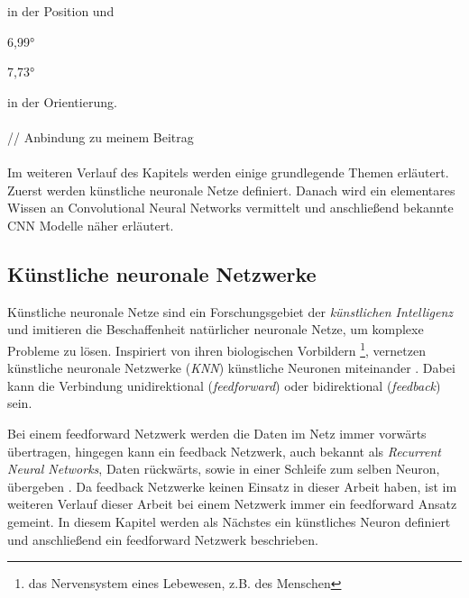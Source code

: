 in der Position und  
 \begin{enumerate*}[label=\alph*)]
 	\addtocounter{enumi}{3}
	\item 6,99°
	\item 7,73°
\end{enumerate*}
in der Orientierung.
\\\\// Anbindung zu meinem Beitrag
\\\\
Im weiteren Verlauf des Kapitels werden einige grundlegende Themen erläutert. Zuerst werden künstliche neuronale Netze definiert. Danach wird ein elementares Wissen an Convolutional Neural Networks vermittelt und anschließend bekannte CNN Modelle näher erläutert.


\subsection{Künstliche neuronale Netzwerke}
\label{sec:KNN}
Künstliche neuronale Netze sind ein Forschungsgebiet der \textit{künstlichen Intelligenz} und imitieren die Beschaffenheit natürlicher neuronale Netze, um komplexe Probleme zu lösen. Inspiriert von ihren biologischen Vorbildern \footnote{das Nervensystem eines Lebewesen, z.B. des Menschen}, vernetzen künstliche neuronale Netzwerke (\textit{KNN}) künstliche Neuronen miteinander \cite{CS231nConvolutionalNeural}. Dabei kann die Verbindung unidirektional (\textit{feedforward}) oder bidirektional (\textit{feedback}) sein. 

Bei einem feedforward Netzwerk werden die Daten im Netz immer vorwärts übertragen, hingegen kann ein feedback Netzwerk, auch bekannt als \textit{Recurrent Neural Networks}, Daten rückwärts, sowie in einer Schleife zum selben Neuron, übergeben \cite{Goodfellow-et-al-2016}. Da feedback Netzwerke keinen Einsatz in dieser Arbeit haben, ist im weiteren Verlauf dieser Arbeit bei einem Netzwerk immer ein feedforward Ansatz gemeint. In diesem Kapitel werden als Nächstes ein künstliches Neuron definiert und anschließend ein feedforward Netzwerk beschrieben.


